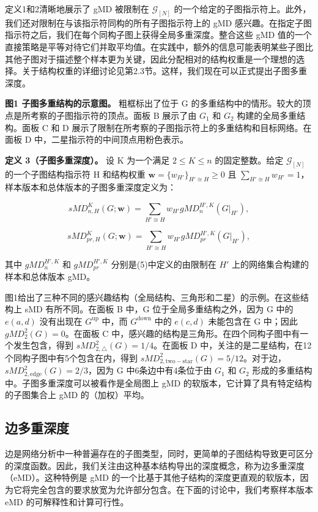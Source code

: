 \documentclass[
  10
]{article}
\begin{document}
定义1和2清晰地展示了 gMD 被限制在 $\mathcal{G}_{[N]}$ 的一个给定的子图指示符上。此外，我们还对限制在与该指示符同构的所有子图指示符上的 gMD 感兴趣。在指定子图指示符之后，我们在每个同构子图上获得全局多重深度。整合这些 gMD 值的一个直接策略是平等对待它们并取平均值。在实践中，额外的信息可能表明某些子图比其他子图对于描述整个样本更为关键，因此分配相对的结构权重是一个理想的选择。关于结构权重的详细讨论见第2.3节。这样，我们现在可以正式提出子图多重深度。

\textbf{图1 子图多重结构的示意图。} 粗框标出了位于 G 的多重结构中的情形。较大的顶点是所考察的子图指示符的顶点。面板 B 展示了由 $G_1$ 和 $G_2$ 构建的全局多重结构。面板 C 和 D 展示了限制在所考察的子图指示符上的多重结构和目标网络。在面板 D 中，二星指示符的中间顶点用粉色表示。

\textbf{定义 3（子图多重深度）。} 设 K 为一个满足 $2\leq K\leq n$ 的固定整数。给定 $\mathcal{G}_{[N]}$ 的一个子图结构指示符 H 和结构权重 $\mathbf{w}=\{w_{H'}\}_{H'\cong H}\geq 0$ 且 $\sum_{H'\cong H}w_{H'}=1$，样本版本和总体版本的子图多重深度定义为：

$$
sMD_{n,H}^K(G;\mathbf{w}) = \sum_{H'\cong H} w_{H'} gMD_n^{H',K}(G|_{H'}),
$$

$$
sMD_{pr,H}^K(G;\mathbf{w}) = \sum_{H'\cong H} w_{H'} gMD_{pr}^{H',K}(G|_{H'}),
$$

其中 $gMD_n^{H',K}$ 和 $gMD_{pr}^{H',K}$ 分别是(5)中定义的由限制在 $H'$ 上的网络集合构建的样本和总体版本 gMD。

图1给出了三种不同的感兴趣结构（全局结构、三角形和二星）的示例。在这些结构上 sMD 有所不同。在面板 B 中，G 位于全局多重结构之外，因为 G 中的 $e(a,d)$ 没有出现在 $G^{\mathrm{up}}$ 中，而 $G^{\mathrm{down}}$ 中的 $e(c,d)$ 未能包含在 G 中；因此 $gMD_2^2(G)=0$。在面板 C 中，感兴趣的结构是三角形。在四个同构子图中有一个发生包含，得到 $sMD_{2,\triangle}^2(G)=1/4$。在面板 D 中，关注的是二星结构，在12个同构子图中有5个包含在内，得到 $sMD_{2,\mathrm{two-star}}^2(G)=5/12$。对于边，$sMD_{2,\mathrm{edge}}^2(G)=2/3$，因为 G 中6条边中有4条位于由 $G_1$ 和 $G_2$ 形成的多重结构中。子图多重深度可以被看作是全局图上 gMD 的软版本，它计算了具有特定结构的子图集合上 gMD 的（加权）平均。

\subsection{边多重深度}

边是网络分析中一种普遍存在的子图类型，同时，更简单的子图结构导致更可区分的深度函数。因此，我们关注由这种基本结构导出的深度概念，称为边多重深度（eMD）。这种特例是 gMD 的一个比基于其他子结构的深度更直观的软版本，因为它将完全包含的要求放宽为允许部分包含。在下面的讨论中，我们考察样本版本 eMD 的可解释性和计算可行性。
\end{document}
